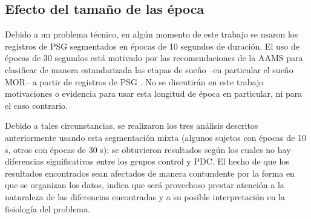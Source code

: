 
%
%


\subsection{Efecto del tama\~no de las \'epoca}

Debido a un problema t\'ecnico, en alg\'un momento de este trabajo se usaron los registros
de PSG segmentados en \'epocas de 10 segundos de duraci\'on.
El uso de \'epocas de 30 segundos est\'a motivado por las recomendaciones de la AAMS para 
clasificar de manera estandarizada las etapas de sue\~no --en particular el sue\~no MOR-- 
a partir de registros de PSG \cite{AASM07}. 
No se discutir\'an en este trabajo motivaciones o evidencia para usar esta longitud de 
\'epoca en particular, ni para el caso contrario. 

Debido a tales circunstancias, se realizaron
los tres an\'alisis descritos anteriormente usando esta segmentaci\'on mixta
(algunos sujetos con \'epocas de 10 s, otros con \'epocas de 30 s); se 
obtuvieron resultados seg\'un los cuales no hay diferencias significativas entre los grupos
control y PDC. %
El hecho de que los resultados encontrados sean afectados de manera contundente
por la forma en que se organizan los
datos, indica que ser\'a provechoso
prestar atenci\'on a la naturaleza de las diferencias encontradas y a su 
posible interpretaci\'on en la fisiolog\'ia del problema.

